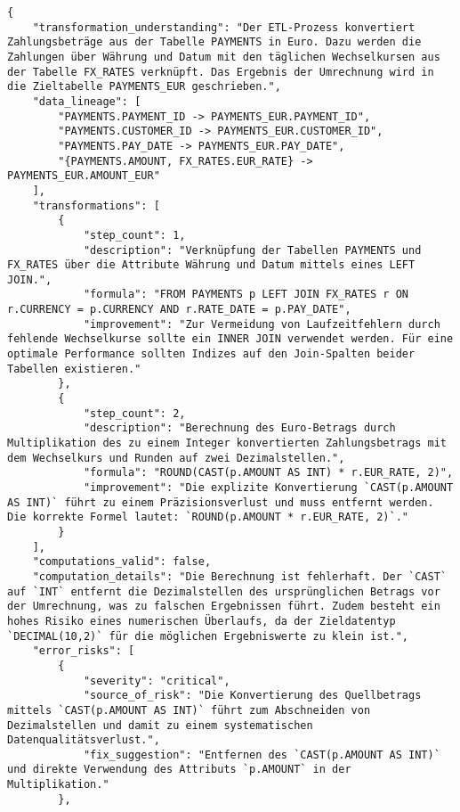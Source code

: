 \begin{lstlisting}[caption={Ausgabe: GEMINI 2.5 Pro Anwendungsfall 4 Konsistenzdurchlauf},label={gemini_case4_prompt2}]
{
    "transformation_understanding": "Der ETL-Prozess konvertiert Zahlungsbeträge aus der Tabelle PAYMENTS in Euro. Dazu werden die Zahlungen über Währung und Datum mit den täglichen Wechselkursen aus der Tabelle FX_RATES verknüpft. Das Ergebnis der Umrechnung wird in die Zieltabelle PAYMENTS_EUR geschrieben.",
    "data_lineage": [
        "PAYMENTS.PAYMENT_ID -> PAYMENTS_EUR.PAYMENT_ID",
        "PAYMENTS.CUSTOMER_ID -> PAYMENTS_EUR.CUSTOMER_ID",
        "PAYMENTS.PAY_DATE -> PAYMENTS_EUR.PAY_DATE",
        "{PAYMENTS.AMOUNT, FX_RATES.EUR_RATE} -> PAYMENTS_EUR.AMOUNT_EUR"
    ],
    "transformations": [
        {
            "step_count": 1,
            "description": "Verknüpfung der Tabellen PAYMENTS und FX_RATES über die Attribute Währung und Datum mittels eines LEFT JOIN.",
            "formula": "FROM PAYMENTS p LEFT JOIN FX_RATES r ON r.CURRENCY = p.CURRENCY AND r.RATE_DATE = p.PAY_DATE",
            "improvement": "Zur Vermeidung von Laufzeitfehlern durch fehlende Wechselkurse sollte ein INNER JOIN verwendet werden. Für eine optimale Performance sollten Indizes auf den Join-Spalten beider Tabellen existieren."
        },
        {
            "step_count": 2,
            "description": "Berechnung des Euro-Betrags durch Multiplikation des zu einem Integer konvertierten Zahlungsbetrags mit dem Wechselkurs und Runden auf zwei Dezimalstellen.",
            "formula": "ROUND(CAST(p.AMOUNT AS INT) * r.EUR_RATE, 2)",
            "improvement": "Die explizite Konvertierung `CAST(p.AMOUNT AS INT)` führt zu einem Präzisionsverlust und muss entfernt werden. Die korrekte Formel lautet: `ROUND(p.AMOUNT * r.EUR_RATE, 2)`."
        }
    ],
    "computations_valid": false,
    "computation_details": "Die Berechnung ist fehlerhaft. Der `CAST` auf `INT` entfernt die Dezimalstellen des ursprünglichen Betrags vor der Umrechnung, was zu falschen Ergebnissen führt. Zudem besteht ein hohes Risiko eines numerischen Überlaufs, da der Zieldatentyp `DECIMAL(10,2)` für die möglichen Ergebniswerte zu klein ist.",
    "error_risks": [
        {
            "severity": "critical",
            "source_of_risk": "Die Konvertierung des Quellbetrags mittels `CAST(p.AMOUNT AS INT)` führt zum Abschneiden von Dezimalstellen und damit zu einem systematischen Datenqualitätsverlust.",
            "fix_suggestion": "Entfernen des `CAST(p.AMOUNT AS INT)` und direkte Verwendung des Attributs `p.AMOUNT` in der Multiplikation."
        },

\end{lstlisting}

